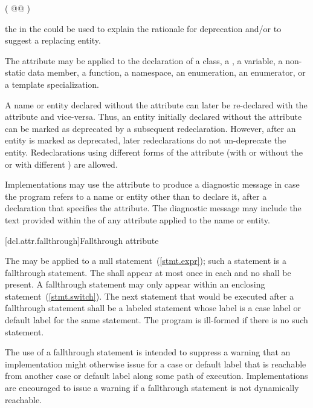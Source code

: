 \begin{codeblock}
( @@ )
\end{codeblock}
\enternote the  in the 
could be used to explain the rationale for deprecation and/or to suggest a replacing entity.
\exitnote

\pnum
The attribute may be applied to the declaration of
a class,
a ,
a variable,
a non-static data member,
a function,
a namespace,
an enumeration,
an enumerator, or
a template specialization.

\pnum
A name or entity declared without the  attribute can later be re-declared
with the attribute and vice-versa. \enternote Thus, an entity initially declared without the
attribute can be marked as deprecated by a subsequent redeclaration. However, after an entity
is marked as deprecated, later redeclarations do not un-deprecate the entity. \exitnote 
Redeclarations using different forms of the attribute (with or without the
 or with different
) are allowed.

\pnum
\enternote Implementations may use the attribute to produce a diagnostic
message in case the program refers to a name or entity other than to declare it, after a
declaration that specifies the attribute. The diagnostic message may include the text provided
within the  of any  attribute applied
to the name or entity. \exitnote

[dcl.attr.fallthrough]{Fallthrough attribute}

\pnum
The  
may be applied to a null statement~(\ref{stmt.expr});
such a statement is a fallthrough statement.
The  
shall appear at most once in each  and
no  shall be present.
A fallthrough statement may only appear within
an enclosing  statement~(\ref{stmt.switch}).
The next statement that would be executed after a fallthrough statement
shall be a labeled statement whose label is a case label or
default label for the same  statement.
The program is ill-formed if there is no such statement.

\pnum
\enternote
The use of a fallthrough statement is intended to suppress
a warning that an implementation might otherwise issue
for a case or default label that is reachable
from another case or default label along some path of execution.
Implementations are encouraged to issue a warning
if a fallthrough statement is not dynamically reachable.
\exitnote

